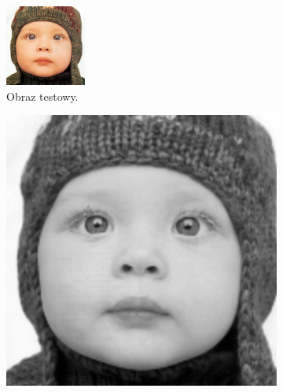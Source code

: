 \documentclass[a4paper,11pt, notitlepage ]{article}
\begin{document}
\begin{figure}[h!]
	\centering
	\begin{subfigure}[b]{0.4\linewidth}
		\includegraphics[width=\linewidth]{SRGAN/test.png}
		\caption{Obraz testowy.}
	\end{subfigure}
	\begin{subfigure}[b]{0.4\linewidth}
		\includegraphics[width=\linewidth]{SRCNN_15000.png}

\end{subfigure}
\end{figure}
\end{document}
